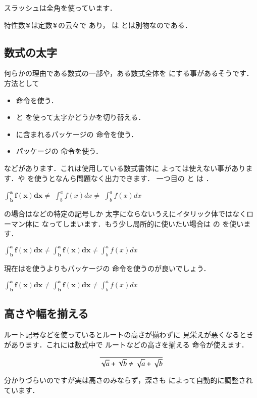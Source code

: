 スラッシュは全角を使っています．

\begin{InOut}
\newcommand{\pile}[2]{%
  {\ooalign{#1\crcr#2}}}
\newcommand{\cpile}[2]{{\ooalign{{%
  \hss#1\hss}\crcr{\hss#2\hss}}}}
\newcommand{\cnot}[1]{%
  \ooalign{／\crcr{\hss{#1}\hss}}}
特性数$\pile Y=$は定数$\cpile Y=$の云々で
あり，\cnot{A}は\pile/Aとは別物なのである．
\end{InOut}

\subsection{数式の太字}
%
何らかの理由である数式の一部や，ある数式全体を
にする事があるそうです．方法として
\begin{itemize}
 \item {}命令を使う．
 \item {} と を使って太字かどうかを切り替える．
 \item {}に含まれるパッケージの 命令を使う．
 \item {}パッケージの  命令を使う．
\end{itemize}
などがあります．これは使用している数式書体に
よっては使えない事があります．や
を使うとなんら問題なく出力できます．
一つ目の  と は
．
\begin{InOut}
\(\mathbf{\int^a_b f(x)dx}  \neq\)
\boldmath  \(\int^a_b f(x)dx  \neq\)
\unboldmath\(\int^a_b f(x)dx \)
\end{InOut}
の場合はなどの特定の記号しか
太字にならないうえにイタリック体ではなくローマン体に
なってしまいます．もう少し局所的に使いたい場合は
の を使います．
\begin{InOut}
\(\mathbf{\int^a_b f(x)dx}  \neq
\boldsymbol{\int^a_b f(x)dx}\neq
\int^a_b f(x)dx \)
\end{InOut}
現在はを使うよりもパッケージの 
命令を使うのが良いでしょう．
\begin{InOut}
\(\mathbf{\int^a_b f(x)dx} \neq
  \bm{\int^a_b f(x)dx} \neq
  \int^a_b f(x)dx \)
\end{InOut}

\subsection{高さや幅を揃える}
%
%
%
ルート記号などを使っているとルートの高さが揃わずに
見栄えが悪くなるときがあります．これには数式中で
ルートなどの高さを揃える 命令が使えます．
\begin{InOut}
\[ \overline{\sqrt a + \sqrt b 
   \neq \sqrt{\mathstrut a}+
   \sqrt{\mathstrut b}} \]
\end{InOut}
分かりづらいのですが実は高さのみならず，深さも 
によって自動的に調整されています．

